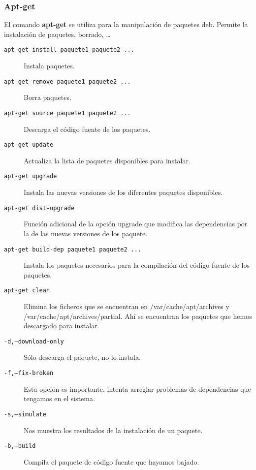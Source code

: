\subsubsection{Apt-get}
El comando {\bf  apt-get} se utiliza para la  manipulación de paquetes
deb. Permite la instalación de paquetes, borrado, \dots


\begin{description}

\item[{\tt apt-get install paquete1 paquete2 ...}] Instala paquetes.

\item[{\tt apt-get remove paquete1 paquete2 ...}] Borra paquetes.

\item[{\tt apt-get  source paquete1 paquete2 ...}]  Descarga el código
fuente de los paquetes.

\item[{\tt  apt-get   update  }]   Actualiza  la  lista   de  paquetes
disponibles para instalar.

\item[{\tt  apt-get upgrade  }] Instala  las nuevas  versiones de  los
diferentes paquetes disponibles.

\item[{\tt  apt-get  dist-upgrade}]  Función adicional  de  la  opción
upgrade que modifica  las dependencias por la de  las nuevas versiones
de los paquete.

\item[{\tt  apt-get  build-dep  paquete1 paquete2  ...}]  Instala  los
paquetes  necesarios para  la  compilación del  código  fuente de  los
paquetes.

\item[{\tt  apt-get clean}]  Elimina  los ficheros  que se  encuentran
en /var/cache/apt/archives  y /var/cache/apt/archives/partial.  Ahí se
encuentran los paquetes que hemos descargado para instalar.

\end{description}

\begin{description}

\item[{\tt  -d,--download-only}]  Sólo  descarga  el  paquete,  no  lo
instala.

\item[{\tt  -f,--fix-broken}]  Esta   opción  es  importante,  intenta
arreglar problemas de dependencias que tengamos en el sistema.

\item[{\tt   -s,--simulate}]  Nos   muestra  los   resultados  de   la
instalación de un paquete.

\item[{\tt  -b,--build}]  Compila  el  paquete de  código  fuente  que
hayamos bajado.

\end{description}

